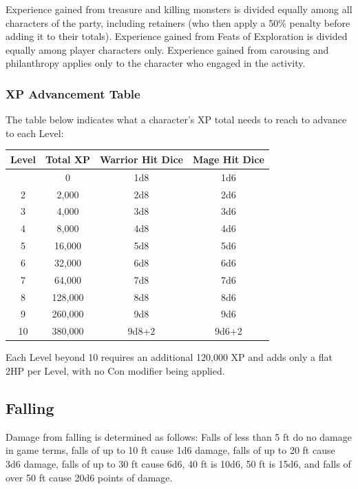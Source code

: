 \documentclass{book}
\begin{document}
Experience gained from treasure and killing monsters is divided equally
among all characters of the party, including retainers (who then apply a
50\% penalty before adding it to their totals). Experience gained from
Feats of Exploration is divided equally among player characters only. Experience gained from carousing and philanthropy applies only to the character who engaged in the activity.

\newpage

\subsubsection*{XP Advancement Table}\label{xp-advancement-table}

The table below indicates what a character's XP total needs to reach to
advance to each Level:

\begin{longtable}[]{@{}cccc@{}}
\toprule\noalign{}
Level & Total XP & Warrior Hit Dice & Mage Hit Dice \\
\midrule\noalign{}
\endhead
\bottomrule\noalign{}
\endlastfoot
1 & 0 & 1d8 & 1d6 \\
2 & 2,000 & 2d8 & 2d6 \\
3 & 4,000 & 3d8 & 3d6 \\
4 & 8,000 & 4d8 & 4d6 \\
5 & 16,000 & 5d8 & 5d6 \\
6 & 32,000 & 6d8 & 6d6 \\
7 & 64,000 & 7d8 & 7d6 \\
8 & 128,000 & 8d8 & 8d6 \\
9 & 260,000 & 9d8 & 9d6 \\
10 & 380,000 & 9d8+2 & 9d6+2 \\
\end{longtable}

Each Level beyond 10 requires an additional 120,000 XP and adds only a
flat 2HP per Level, with no Con modifier being applied.

\subsection*{Falling}\label{falling}

Damage from falling is determined as follows: Falls of less than 5 ft do
no damage in game terms, falls of up to 10 ft cause 1d6 damage, falls of
up to 20 ft cause 3d6 damage, falls of up to 30 ft cause 6d6, 40 ft is
10d6, 50 ft is 15d6, and falls of over 50 ft cause 20d6 points of
damage.
\end{document}
